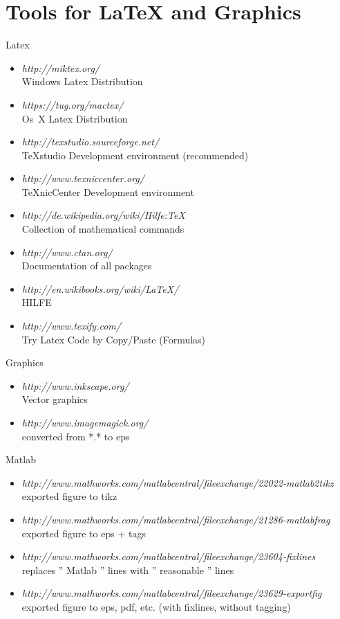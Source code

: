 \chapter{Tools for LaTeX and Graphics}
Latex
\begin{itemize}
	\item \emph{http://miktex.org/}   \\ Windows Latex Distribution
	\item \emph{https://tug.org/mactex/}   \\ Os~X Latex Distribution
	\item \emph{http://texstudio.sourceforge.net/}  \\ TeXstudio Development environment (recommended)
	\item \emph{http://www.texniccenter.org/}  \\ TeXnicCenter Development environment
	\item \emph{http://de.wikipedia.org/wiki/Hilfe:TeX}   \\ Collection of mathematical commands
	\item \emph{http://www.ctan.org/} \\ Documentation of all packages
	\item \emph{http://en.wikibooks.org/wiki/LaTeX/} \\ HILFE
	\item \emph{http://www.texify.com/}	\\ Try Latex Code by Copy/Paste (Formulas)
\end{itemize}
Graphics
\begin{itemize}
	\item \emph{http://www.inkscape.org/}   \\ Vector graphics
	\item \emph{http://www.imagemagick.org/}  \\ converted from *.* to eps	
\end{itemize}
\clearpage
Matlab
\begin{itemize}
	\item \emph{http://www.mathworks.com/matlabcentral/fileexchange/22022-matlab2tikz} \\ exported figure to tikz
	\item \emph{http://www.mathworks.com/matlabcentral/fileexchange/21286-matlabfrag} \\ exported figure to eps + tags
	\item \emph{http://www.mathworks.com/matlabcentral/fileexchange/23604-fixlines} \\ replaces '' Matlab '' lines with '' reasonable '' lines
	\item \emph{http://www.mathworks.com/matlabcentral/fileexchange/23629-exportfig} \\ exported figure to eps, pdf, etc. (with fixlines, without tagging)
\end{itemize}
